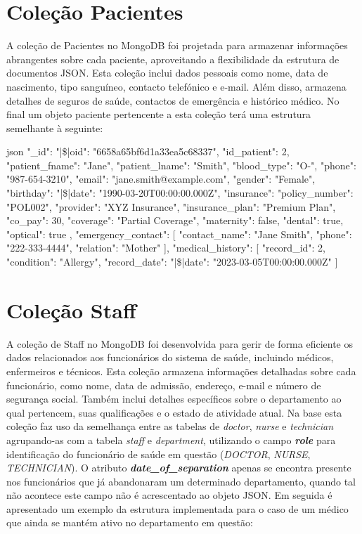 \section{Coleção Pacientes}
A coleção de Pacientes no MongoDB foi projetada para armazenar informações abrangentes sobre cada paciente, aproveitando a flexibilidade da estrutura de documentos JSON. Esta coleção inclui dados pessoais como nome, data de nascimento, tipo sanguíneo, contacto telefónico e e-mail. Além disso, armazena detalhes de seguros de saúde, contactos de emergência e histórico médico. No final um objeto paciente pertencente a esta coleção terá uma estrutura semelhante à seguinte:

\begin{myminted}{json}
{
  "_id": {"|\$|oid": "6658a65bf6d1a33ea5c68337"},
  "id_patient": 2,
  "patient_fname": "Jane",
  "patient_lname": "Smith",
  "blood_type": "O-",
  "phone": "987-654-3210",
  "email": "jane.smith@example.com",
  "gender": "Female",
  "birthday": {"|\$|date": "1990-03-20T00:00:00.000Z"},
  "insurance": {
    "policy_number": "POL002",
    "provider": "XYZ Insurance",
    "insurance_plan": "Premium Plan",
    "co_pay": 30,
    "coverage": "Partial Coverage",
    "maternity": false,
    "dental": true,
    "optical": true
  },
  "emergency_contact": [
    {
      "contact_name": "Jane Smith",
      "phone": "222-333-4444",
      "relation": "Mother"
    }
  ],
  "medical_history": [
    {
      "record_id": 2,
      "condition": "Allergy",
      "record_date": {"|\$|date": "2023-03-05T00:00:00.000Z"}
    }
  ]
}
\end{myminted}


\section{Coleção Staff}
A coleção de Staff no MongoDB foi desenvolvida para gerir de forma eficiente os dados relacionados aos funcionários do sistema de saúde, incluindo médicos, enfermeiros e técnicos. Esta coleção armazena informações detalhadas sobre cada funcionário, como nome, data de admissão, endereço, e-mail e número de segurança social. Também inclui detalhes específicos sobre o departamento ao qual pertencem, suas qualificações e o estado de atividade atual. Na base esta coleção faz uso da semelhança entre as tabelas de \textit{doctor}, \textit{nurse} e \textit{technician} agrupando-as com a tabela \textit{staff} e \textit{department}, utilizando o campo \textit{\textbf{role}} para identificação do funcionário de saúde em questão (\textit{DOCTOR}, \textit{NURSE}, \textit{TECHNICIAN}). O atributo \textit{\textbf{date\_of\_separation}} apenas se encontra presente nos funcionários que já abandonaram um determinado departamento, quando tal não acontece este campo não é acrescentado ao objeto JSON. Em seguida é apresentado um exemplo da estrutura implementada para o caso de um médico que ainda se mantém ativo no departamento em questão:


